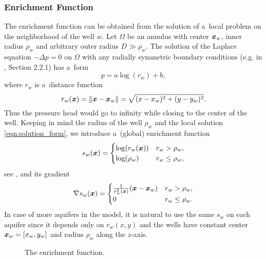 \subsubsection{Enrichment Function}
\label{sec:enrichment_func}
The enrichment function can be obtained from the solution of a~local problem on the neighborhood of the well $w$.
Let $\Omega$ be an annulus with center $\mathbf{\boldsymbol{x}}_w$, inner radius $\rho_w$ and arbitrary outer radius $D \gg \rho_w$.
The solution of the Laplace equation $-\Delta p = 0$ on $\Omega$ with any radially symmetric boundary conditions
(e.g. in \cite{evans_partial_2010}, Section 2.2.1) has a~form
%
\begin{equation} \label{eqn:solution_form}
  p = a \log(r_w)+b, %
\end{equation}
where $r_w$ is a~distance function
\begin{equation} \label{eqn:distance}
r_w(\mathbf{\boldsymbol{x}}) = \|\mathbf{\boldsymbol{x}} - \mathbf{\boldsymbol{x}}_w\|= \sqrt{(x-x_w)^2+(y-y_w)^2}.
\end{equation}
%
Thus the pressure head would go to infinity while closing to the center of the well.
Keeping in mind the radius of the well $\rho_w$ and the local solution \eqref{eqn:solution_form}, 
we introduce a~(global) enrichment function
%
\begin{equation}
\label{eqn:enrich_func}
s_w(\mathbf{\boldsymbol{x}}) = 
  \begin{cases}
  \log(r_w(\mathbf{\boldsymbol{x}})) & r_w > \rho_w,\\
  \log(\rho_w) & r_w \le \rho_w,\\
  \end{cases}
\end{equation}
see , and its gradient
\begin{equation} \label{eqn:enrich_grad}
\nabla s_w(\mathbf{\boldsymbol{x}}) = 
  \begin{cases}  
    \frac{1}{r_w^2(\mathbf{\boldsymbol{x}})}(\mathbf{\boldsymbol{x}} - \mathbf{\boldsymbol{x}}_w) & r_w > \rho_w, \\
    0 & r_w \leq \rho_w.
  \end{cases}
\end{equation}
In case of more aquifers in the model, it is natural to use the same $s_w$ on each aquifer 
since it depends only on $r_w(x,y)$ and the wells have constant center $\mathbf{\boldsymbol{x}}_w=[x_w, y_w]$ and radius $\rho_w$ along the $z$-axis.

\begin{figure}[!htb]
  \begin{center}         
    \def\svgwidth{0.5\textwidth}
    
  \end{center}
  \caption{The enrichment function.}
  \label{fig:enrich_func}
\end{figure}


